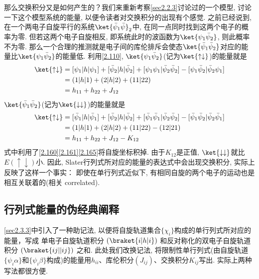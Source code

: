 那么交换积分又是如何产生的？我们来重新考察\autoref{sec2.2.3}讨论过的一个模型, 
讨论一下这个模型系统的能量, 
以便令读者对交换积分的出现有个感觉. 
之前已经说到, 
在一个两电子自旋平行的系统$\ket{\bar{\psi}_1\bar{\psi}}_2$中, 
在同一点同时找到这两个电子的概率为零. 
但若这两个电子自旋相反, 
即系统此时的波函数为$\ket{{\psi}_1\bar{\psi}_2}$, 
则此概率不为零. 
那么一个合理的推测就是电子间的库伦排斥会使态$\ket{\bar{\psi}_1\bar{\psi}_2}$对应的能量比$\ket{\psi_1\bar{\psi}_2}$的能量低. 
利用\autoref{2.110}, 
$\ket{\psi_1\bar{\psi}_2}$(记为$\ket{\uparrow\downarrow}$)的能量就是
\begin{align}
\ket{\uparrow\downarrow} & =[\psi_1|h|\psi_1] + [\bar{\psi}_2|h|\bar{\psi}_2] + [\psi_1\psi_1|\bar{\psi}_2\bar{\psi}_2] - [\psi_1\bar{\psi}_2|\bar{\psi}_2\psi_1]\notag\\
& = (1|h|1) + (2|h|2) + (11|22)\notag\\
& = h_{11} + h_{22} + J_{12}
\end{align}
$\ket{\bar{\psi}_1\bar{\psi}_2}$(记为$\ket{\downarrow\downarrow}$)的能量就是
\begin{align}
\ket{\uparrow\downarrow} & =[\bar{\psi}_1|h|\bar{\psi}_1] + [\bar{\psi}_2|h|\bar{\psi}_2] + [\bar{\psi}_1\bar{\psi}_1|\bar{\psi}_2\bar{\psi}_2] - [\bar{\psi}_1\bar{\psi}_2|\bar{\psi}_2\bar{\psi}_1]\notag\\
& = (1|h|1) + (2|h|2) + (11|22) - (12|21)\notag\\
& = h_{11} + h_{22} + J_{12} - K_{12}
\end{align}
式中利用了\autoref{2.160}\autoref{2.161}\autoref{2.165}将自旋坐标积掉. 
由于$K_{12}$是正值, 
$\ket{\downarrow\downarrow}$就比$E(\uparrow\downarrow)$小. 
因此, 
Slater行列式所对应的能量的表达式中会出现交换积分, 
实际上反映了这样一个事实： 即使在单行列式近似下, 
有相同自旋的两个电子的运动也是相互关联着的(相关 correlated).

\subsection{行列式能量的伪经典阐释}
\label{sec2.3.7}
\autoref{sec2.3.3}中引入了一种助记法, 
以便将自旋轨道集合$\{\chi_i\}$构成的单行列式所对应的能量，写成
单电子自旋轨道积分 $(\braket{i|h|i})$ 和反对称化的双电子自旋轨道积分 $(\braket{ij||ij})$ 之和. 
此处我们改换记法, 
将限制性单行列式(由自旋轨道$\{ \psi_i\alpha \}$和$\{ \psi_i\beta \}$构成)的能量用$h_{ii}$、库伦积分$(J_{ij})$、交换积分$K_{ij}$写出. 
实际上两种写法都很方便.

